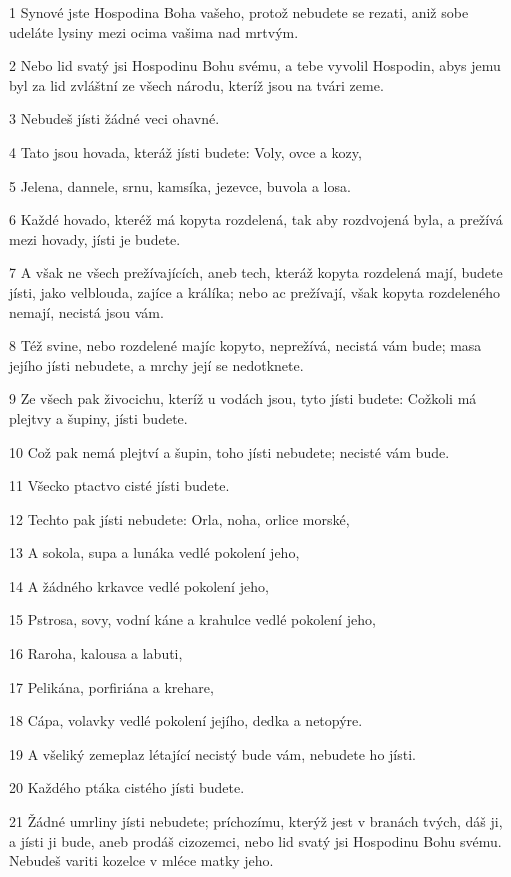 \par 1 Synové jste Hospodina Boha vašeho, protož nebudete se rezati, aniž sobe udeláte lysiny mezi ocima vašima nad mrtvým.
\par 2 Nebo lid svatý jsi Hospodinu Bohu svému, a tebe vyvolil Hospodin, abys jemu byl za lid zvláštní ze všech národu, kteríž jsou na tvári zeme.
\par 3 Nebudeš jísti žádné veci ohavné.
\par 4 Tato jsou hovada, kteráž jísti budete: Voly, ovce a kozy,
\par 5 Jelena, dannele, srnu, kamsíka, jezevce, buvola a losa.
\par 6 Každé hovado, kteréž má kopyta rozdelená, tak aby rozdvojená byla, a prežívá mezi hovady, jísti je budete.
\par 7 A však ne všech prežívajících, aneb tech, kteráž kopyta rozdelená mají, budete jísti, jako velblouda, zajíce a králíka; nebo ac prežívají, však kopyta rozdeleného nemají, necistá jsou vám.
\par 8 Též svine, nebo rozdelené majíc kopyto, neprežívá, necistá vám bude; masa jejího jísti nebudete, a mrchy její se nedotknete.
\par 9 Ze všech pak živocichu, kteríž u vodách jsou, tyto jísti budete: Cožkoli má plejtvy a šupiny, jísti budete.
\par 10 Což pak nemá plejtví a šupin, toho jísti nebudete; necisté vám bude.
\par 11 Všecko ptactvo cisté jísti budete.
\par 12 Techto pak jísti nebudete: Orla, noha, orlice morské,
\par 13 A sokola, supa a lunáka vedlé pokolení jeho,
\par 14 A žádného krkavce vedlé pokolení jeho,
\par 15 Pstrosa, sovy, vodní káne a krahulce vedlé pokolení jeho,
\par 16 Raroha, kalousa a labuti,
\par 17 Pelikána, porfiriána a krehare,
\par 18 Cápa, volavky vedlé pokolení jejího, dedka a netopýre.
\par 19 A všeliký zemeplaz létající necistý bude vám, nebudete ho jísti.
\par 20 Každého ptáka cistého jísti budete.
\par 21 Žádné umrliny jísti nebudete; príchozímu, kterýž jest v branách tvých, dáš ji, a jísti ji bude, aneb prodáš cizozemci, nebo lid svatý jsi Hospodinu Bohu svému. Nebudeš variti kozelce v mléce matky jeho.

